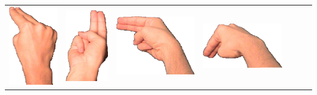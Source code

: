 \documentclass{article}
\begin{document}
\begin{center}
\begin{tabular}{r*{6}{c}}
\includegraphics[scale=0.1]{images/02-05-3.jpg}&
\includegraphics[scale=0.1]{images/02-05-4.jpg}&
\includegraphics[scale=0.1]{images/02-05-5.jpg}&
\includegraphics[scale=0.1]{images/02-05-6.jpg}\\

\end{tabular}
\end{center}
\end{document}

